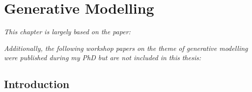 \chapter{Generative Modelling}

\ifpdf
    \graphicspath{{Chapter5/Figs/Raster/}{Chapter5/Figs/PDF/}{Chapter5/Figs/}}
\else
    \graphicspath{{Chapter5/Figs/Vector/}{Chapter5/Figs/}}
\fi

\emph{This chapter is largely based on the paper:}

\begin{quote}
\end{quote}

\emph{Additionally, the following workshop papers on the theme of generative modelling were published during my PhD but are not included in this thesis:}

\begin{quote}
\end{quote}

\begin{quote}
\end{quote}





\section{Introduction}
